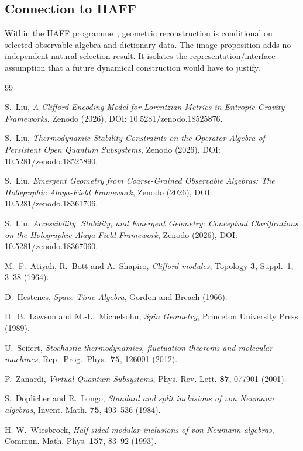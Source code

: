 \documentclass[12pt]{article}
\begin{document}
\subsection{Connection to HAFF}

Within the HAFF programme~\cite{Liu2026PaperA,Liu2026PaperB}, geometric reconstruction is conditional on selected observable-algebra and dictionary data.  The image proposition adds no independent natural-selection result.  It isolates the representation/interface assumption that a future dynamical construction would have to justify.

\begin{thebibliography}{99}

S.~Liu, \emph{A Clifford-Encoding Model for Lorentzian Metrics in Entropic Gravity Frameworks}, Zenodo (2026), DOI: 10.5281/zenodo.18525876.

S.~Liu, \emph{Thermodynamic Stability Constraints on the Operator Algebra of Persistent Open Quantum Subsystems}, Zenodo (2026), DOI: 10.5281/zenodo.18525890.

S.~Liu, \emph{Emergent Geometry from Coarse-Grained Observable Algebras: The Holographic Alaya-Field Framework}, Zenodo (2026), DOI: 10.5281/zenodo.18361706.

S.~Liu, \emph{Accessibility, Stability, and Emergent Geometry: Conceptual Clarifications on the Holographic Alaya-Field Framework}, Zenodo (2026), DOI: 10.5281/zenodo.18367060.

M.~F.~Atiyah, R.~Bott and A.~Shapiro,
\emph{Clifford modules},
Topology \textbf{3}, Suppl.~1, 3--38 (1964).

D.~Hestenes, \emph{Space-Time Algebra}, Gordon and Breach (1966).

H.~B.~Lawson and M.-L.~Michelsohn,
\emph{Spin Geometry},
Princeton University Press (1989).

U.~Seifert, \emph{Stochastic thermodynamics, fluctuation theorems and molecular machines}, Rep.\ Prog.\ Phys.\ \textbf{75}, 126001 (2012).

P.~Zanardi, \emph{Virtual Quantum Subsystems}, Phys. Rev. Lett. \textbf{87}, 077901 (2001).

S.~Doplicher and R.~Longo, \emph{Standard and split inclusions of von Neumann algebras}, Invent. Math. \textbf{75}, 493--536 (1984).

H.-W.~Wiesbrock, \emph{Half-sided modular inclusions of von Neumann algebras}, Commun. Math. Phys. \textbf{157}, 83--92 (1993).

\end{thebibliography}
\end{document}
